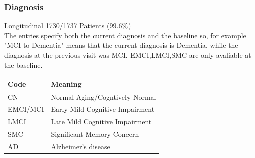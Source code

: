 \documentclass{beamer}
\begin{document}
    \begin{frame}
        \frametitle{Diagnosis}
        Longitudinal \hfill 1730/1737 Patients (99.6\%)\\
        \vspace{0.2in}
        The entries specify both the current diagnosis and the baseline so, for example "MCI to Dementia" means that the current diagnosis is Dementia, while the diagnosis at the previous visit was MCI. EMCI,LMCI,SMC are only avaliable at the baseline.
        \begin{table}[]
        \begin{tabular}{ll}
        \hline
        Code                       & Meaning                                              \\ \hline
        \multicolumn{1}{|l|}{CN}   & \multicolumn{1}{l|}{Normal Aging/Cogntively Normal}  \\ \hline
        \multicolumn{1}{|l|}{EMCI/MCI} & \multicolumn{1}{l|}{Early Mild Cognitive Impairment} \\ \hline
        \multicolumn{1}{|l|}{LMCI} & \multicolumn{1}{l|}{Late Mild Cognitive Impairment}  \\ \hline
        \multicolumn{1}{|l|}{SMC}   & \multicolumn{1}{l|}{Significant Memory Concern}     \\ \hline
        \multicolumn{1}{|l|}{AD}   & \multicolumn{1}{l|}{Alzheimer’s disease}             \\ \hline
        \end{tabular}
        \end{table}
    \end{frame}
\end{document}
